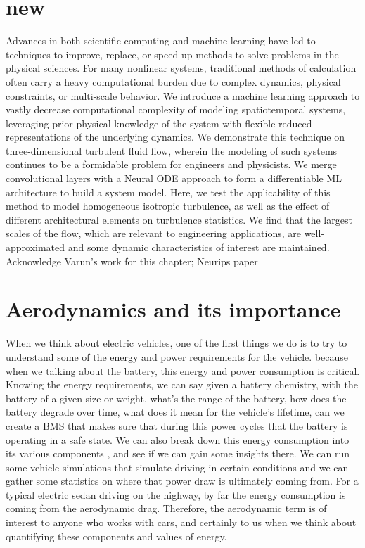 
\section{new}

Advances in both scientific computing and machine learning have led to techniques to improve, replace, or speed up methods to solve problems in the physical sciences. 
 For many nonlinear systems, traditional methods of calculation often carry a heavy computational burden due to complex dynamics, physical constraints, or multi-scale behavior. 
 We introduce a machine learning approach to vastly decrease computational complexity of modeling spatiotemporal systems, leveraging prior physical knowledge of the system with flexible reduced representations of the underlying dynamics. 
 We demonstrate this technique on three-dimensional turbulent fluid flow, wherein the modeling of such systems continues to be a formidable problem for engineers and physicists. 
 We merge convolutional layers with a Neural ODE approach to form a differentiable ML architecture to build a system model. 
 Here, we test the applicability of this method to model homogeneous isotropic turbulence, as well as the effect of different architectural elements on turbulence statistics. 
 We find that the largest scales of the flow, which are relevant to engineering applications, are well-approximated and some dynamic characteristics of interest are maintained.
Acknowledge Varun's work for this chapter; Neurips paper
\section{Aerodynamics and its importance}
When we think about electric vehicles, one of the first things we do is to try to understand some of the energy and power requirements for the vehicle. because when we talking about the battery, this energy and power consumption is critical. Knowing the energy requirements, we can say given a battery chemistry, with the battery of a given size or weight, what's the range of the battery, how does the battery degrade over time, what does it mean for the vehicle's lifetime, can we create a BMS that makes sure that during this power cycles that the battery is operating in a safe state. We can also break down this energy consumption into its various components , and see if we can gain some insights there. We can run some vehicle simulations that simulate driving in certain conditions and we can gather some statistics on where that power draw is ultimately coming from. For a typical electric sedan driving on the highway, by far the energy consumption is coming from the aerodynamic drag. Therefore, the aerodynamic term is of interest to anyone who works with cars, and certainly to us when we think about quantifying these components and values of energy. 
